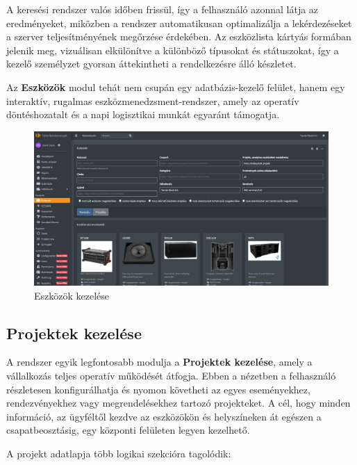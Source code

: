 A keresési rendszer valós időben frissül, így a felhasználó azonnal látja az eredményeket, 
miközben a rendszer automatikusan optimalizálja a lekérdezéseket a szerver teljesítményének megőrzése érdekében.  
Az eszközlista kártyás formában jelenik meg, vizuálisan elkülönítve a különböző típusokat és státuszokat, 
így a kezelő személyzet gyorsan áttekintheti a rendelkezésre álló készletet.

Az \textbf{Eszközök} modul tehát nem csupán egy adatbázis-kezelő felület, hanem egy interaktív, 
rugalmas eszközmenedzsment-rendszer, amely az operatív döntéshozatalt és a napi logisztikai munkát egyaránt támogatja.

\begin{figure}[H]
	\centering
    \includegraphics[width=150mm, keepaspectratio]{figures/items.jpg}
    \caption{Eszközök kezelése}
    \label{fig:items}
\end{figure}
\subsection{Projektek kezelése}

A rendszer egyik legfontosabb modulja a \textbf{Projektek kezelése}, amely a vállalkozás teljes operatív működését átfogja.  
Ebben a nézetben a felhasználó részletesen konfigurálhatja és nyomon követheti az egyes eseményekhez, rendezvényekhez vagy megrendelésekhez tartozó projekteket.  
A cél, hogy minden információ, az ügyféltől kezdve az eszközökön és helyszíneken át egészen a csapatbeosztásig, egy központi felületen legyen kezelhető.

A projekt adatlapja több logikai szekcióra tagolódik:

